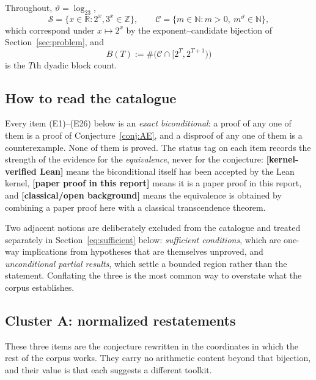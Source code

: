 \documentclass[11pt,oneside]{article}
\theoremstyle{definition}
\theoremstyle{remark}
\newcommand{\N}{\mathbb N}
\newcommand{\Z}{\mathbb Z}
\newcommand{\R}{\mathbb R}
\newcommand{\thetaq}{\vartheta}
\newcommand{\Sol}{\mathcal S}
\newcommand{\Cand}{\mathcal C}
\newcommand{\statuslean}{\textcolor{leanblue}{\textbf{[kernel-verified Lean]}}}
\newcommand{\statusnew}{\textcolor{newgreen}{\textbf{[paper proof in this report]}}}
\newcommand{\statusknown}{\textcolor{classicalgray}{\textbf{[classical/open background]}}}
\begin{document}
Throughout, $\thetaq=\log_23$,
\[
 \Sol=\{x\in\R:2^x,3^x\in\Z\},
 \qquad
 \Cand=\{m\in\N:m>0,\ m^{\thetaq}\in\N\},
\]
which correspond under $x\mapsto2^x$ by the exponent--candidate bijection of
Section~\ref{sec:problem}, and
\[
 B(T):=\#\bigl(\Cand\cap[2^T,2^{T+1})\bigr)
\]
is the $T$th dyadic block count.

\subsection{How to read the catalogue}

Every item (E1)--(E26) below is an \emph{exact biconditional}: a proof of any one of them is a
proof of Conjecture~\ref{conj:AE}, and a disproof of any one of them is a counterexample.
None of them is proved.  The status tag on each item records the strength of the evidence for
the \emph{equivalence}, never for the conjecture: \statuslean{} means the biconditional itself
has been accepted by the Lean kernel, \statusnew{} means it is a paper proof in this report,
and \statusknown{} means the equivalence is obtained by combining a paper proof here with a
classical transcendence theorem.

Two adjacent notions are deliberately excluded from the catalogue and treated separately in
Section~\ref{eq:sufficient} below: \emph{sufficient conditions}, which are one-way
implications from hypotheses that are themselves unproved, and \emph{unconditional partial
results}, which settle a bounded region rather than the statement.  Conflating the three is
the most common way to overstate what the corpus establishes.

\subsection{Cluster A: normalized restatements}

These three items are the conjecture rewritten in the coordinates in which the rest of the
corpus works.  They carry no arithmetic content beyond that bijection, and their value is that
each suggests a different toolkit.
\end{document}
